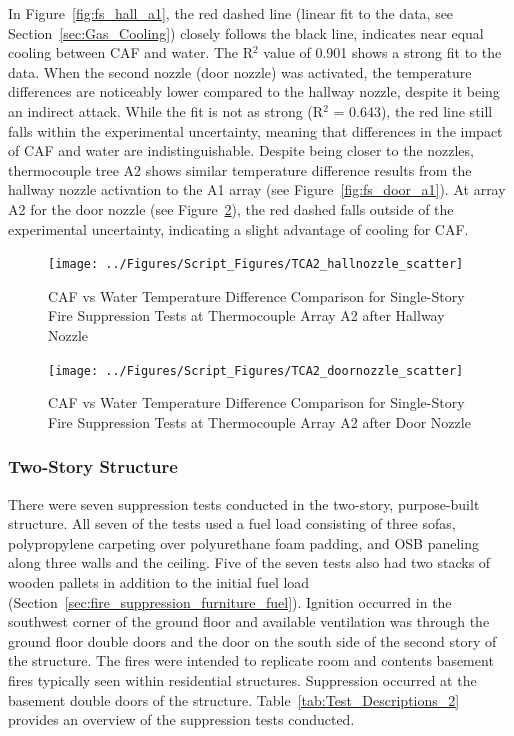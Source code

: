 \documentclass[12pt,oneside]{book}
\begin{document}
In Figure~\ref{fig:fs_hall_a1}, the red dashed line (linear fit to the data, see Section~\ref{sec:Gas_Cooling}) closely follows the black line, indicates near equal cooling between CAF and water. The R$^2$ value of 0.901 shows a strong fit to the data. When the second nozzle (door nozzle) was activated, the temperature differences are noticeably lower compared to the hallway nozzle, despite it being an indirect attack. While the fit is not as strong (R$^2$ = 0.643), the red line still falls within the experimental uncertainty, meaning that differences in the impact of CAF and water are indistinguishable. Despite being closer to the nozzles, thermocouple tree A2 shows similar temperature difference results from the hallway nozzle activation to the A1 array (see Figure~\ref{fig:fs_door_a1}). At array A2 for the door nozzle (see Figure~\ref{fig:fs_door_a2}), the red dashed falls outside of the experimental uncertainty, indicating a slight advantage of cooling for CAF.

\begin{figure}[!ht]
	\texttt{[image: ../Figures/Script\_Figures/TCA2\_hallnozzle\_scatter]}
	\caption{CAF vs Water Temperature Difference Comparison for Single-Story Fire Suppression Tests at Thermocouple Array A2 after Hallway Nozzle}
	\label{fig:fs_hall_a2}
\end{figure}

\begin{figure}[!ht]
	\texttt{[image: ../Figures/Script\_Figures/TCA2\_doornozzle\_scatter]}
	\caption{CAF vs Water Temperature Difference Comparison for Single-Story Fire Suppression Tests at Thermocouple Array A2 after Door Nozzle}
	\label{fig:fs_door_a2}
\end{figure}

\subsubsection*{Two-Story Structure}
\label{sec:fire_supp_two}

There were seven suppression tests conducted in the two-story, purpose-built structure. All seven of the tests used a fuel load consisting of three sofas, polypropylene carpeting over polyurethane foam padding, and OSB paneling along three walls and the ceiling. Five of the seven tests also had two stacks of wooden pallets in addition to the initial fuel load (Section~\ref{sec:fire_suppression_furniture_fuel}). Ignition occurred in the southwest corner of the ground floor and available ventilation was through the ground floor double doors and the door on the south side of the second story of the structure. The fires were intended to replicate room and contents basement fires typically seen within residential structures. Suppression occurred at the basement double doors of the structure. Table~\ref{tab:Test_Descriptions_2} provides an overview of the suppression tests conducted.
\end{document}
